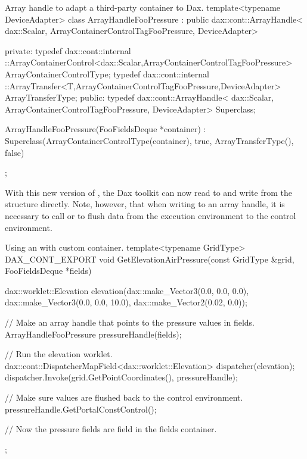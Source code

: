 \begin{daxexample}{Array handle to adapt a third-party container to Dax.}
template<typename DeviceAdapter>
class ArrayHandleFooPressure
    : public dax::cont::ArrayHandle<
                dax::Scalar, ArrayContainerControlTagFooPressure, DeviceAdapter>
{
private:
  typedef dax::cont::internal
      ::ArrayContainerControl<dax::Scalar,ArrayContainerControlTagFooPressure>
      ArrayContainerControlType;
  typedef dax::cont::internal
      ::ArrayTransfer<T,ArrayContainerControlTagFooPressure,DeviceAdapter>
      ArrayTransferType;
public:
  typedef dax::cont::ArrayHandle<
      dax::Scalar, ArrayContainerControlTagFooPressure, DeviceAdapter> Superclass;

  ArrayHandleFooPressure(FooFieldsDeque *container)
    : Superclass(ArrayContainerControlType(container), true, ArrayTransferType(), false)
  {  }
};
\end{daxexample}

With this new version of , the Dax toolkit can
now read to and write from the  structure
directly. Note, however, that when writing to an array handle, it is
necessary to call  or
 to flush data from the execution
environment to the control environment. 

\begin{daxexample}{Using an  with custom container.}
template<typename GridType>
DAX_CONT_EXPORT
void GetElevationAirPressure(const GridType &grid, FooFieldsDeque *fields)
{
  dax::worklet::Elevation elevation(dax::make_Vector3(0.0, 0.0, 0.0),
                                    dax::make_Vector3(0.0, 0.0, 10.0),
                                    dax::make_Vector2(0.02, 0.0));

  // Make an array handle that points to the pressure values in fields.
  ArrayHandleFooPressure pressureHandle(fields);

  // Run the elevation worklet.
  dax::cont::DispatcherMapField<dax::worklet::Elevation> dispatcher(elevation);
  dispatcher.Invoke(grid.GetPointCoordinates(), pressureHandle);

  // Make sure values are flushed back to the control environment.
  pressureHandle.GetPortalConstControl();

  // Now the pressure fields are field in the fields container.
};
\end{daxexample}

